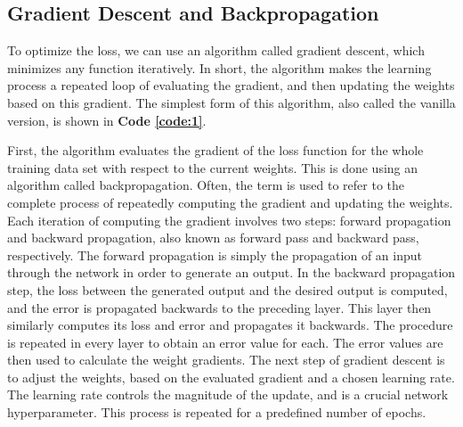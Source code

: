 
\subsection{Gradient Descent and Backpropagation} \label{backprop}

\noindent To optimize the loss, we can use an algorithm called gradient descent, which minimizes any function iteratively. In short, the algorithm makes the learning process a repeated loop of evaluating the gradient, and then updating the weights based on this gradient. The simplest form of this algorithm, also called the vanilla version, is shown in \textbf{Code \ref{code:1}}. \\


\noindent First, the algorithm evaluates the gradient of the loss function for the whole training data set with respect to the current weights. This is done using an algorithm called backpropagation. Often, the term is used to refer to the complete process of repeatedly computing the gradient and updating the weights. Each iteration of computing the gradient involves two steps: forward propagation and backward propagation, also known as forward pass and backward pass, respectively. The forward propagation is simply the propagation of an input through the network in order to generate an output. In the backward propagation step, the loss between the generated output and the desired output is computed, and the error is propagated backwards to the preceding layer. This layer then similarly computes its loss and error and propagates it backwards. The procedure is repeated in every layer to obtain an error value for each. The error values are then used to calculate the weight gradients. The next step of gradient descent is to adjust the weights, based on the evaluated gradient and a chosen learning rate. The learning rate controls the magnitude of the update, and is a crucial network hyperparameter. This process is repeated for a predefined number of epochs.

